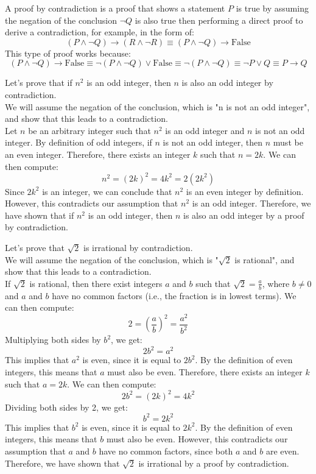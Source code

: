 \begin{definition}
    A proof by contradiction is a proof that shows a statement $P$ is true by assuming the negation of the conclusion $\neg Q$ is also true then performing a direct proof to derive a contradiction, for example, in the form of:
    \[
        (P \land \neg Q) \to (R \land \neg R) \equiv (P \land \neg Q) \to \text{False}
    \]
    This type of proof works because:
    \[
        (P \land \neg Q) \to \text{False} \equiv \neg (P \land \neg Q) \lor \text{False} \equiv \neg (P \land \neg Q) \equiv \neg P \lor Q \equiv P \to Q
    \]
\end{definition}

\begin{eg}
    Let's prove that if $n^2$ is an odd integer, then $n$ is also an odd integer by contradiction. \\
    We will assume the negation of the conclusion, which is "n is not an odd integer", and show that this leads to a contradiction. \\
    Let $n$ be an arbitrary integer such that $n^2$ is an odd integer and $n$ is not an odd integer. By definition of odd integers, if $n$ is not an odd integer, then $n$ must be an even integer. Therefore, there exists an integer $k$ such that $n = 2k$. We can then compute:
    \[
        n^2 = (2k)^2 = 4k^2 = 2(2k^2)
    \]
    Since $2k^2$ is an integer, we can conclude that $n^2$ is an even integer by definition. However, this contradicts our assumption that $n^2$ is an odd integer. Therefore, we have shown that if $n^2$ is an odd integer, then $n$ is also an odd integer by a proof by contradiction.
\end{eg}

\begin{eg}
    Let's prove that $\sqrt{2}$ is irrational by contradiction. \\
    We will assume the negation of the conclusion, which is "$\sqrt{2}$ is rational", and show that this leads to a contradiction. \\
    If $\sqrt{2}$ is rational, then there exist integers $a$ and $b$ such that $\sqrt{2} = \frac{a}{b}$, where $b \neq 0$ and $a$ and $b$ have no common factors (i.e., the fraction is in lowest terms). We can then compute:
    \[
        2 = \left(\frac{a}{b}\right)^2 = \frac{a^2}{b^2}
    \]
    Multiplying both sides by $b^2$, we get:
    \[
        2b^2 = a^2
    \]
    This implies that $a^2$ is even, since it is equal to $2b^2$. By the definition of even integers, this means that $a$ must also be even. Therefore, there exists an integer $k$ such that $a = 2k$. We can then compute:
    \[
        2b^2 = (2k)^2 = 4k^2
    \]
    Dividing both sides by 2, we get:
    \[
        b^2 = 2k^2
    \]
    This implies that $b^2$ is even, since it is equal to $2k^2$. By the definition of even integers, this means that $b$ must also be even. However, this contradicts our assumption that $a$ and $b$ have no common factors, since both $a$ and $b$ are even. Therefore, we have shown that $\sqrt{2}$ is irrational by a proof by contradiction.
\end{eg}

